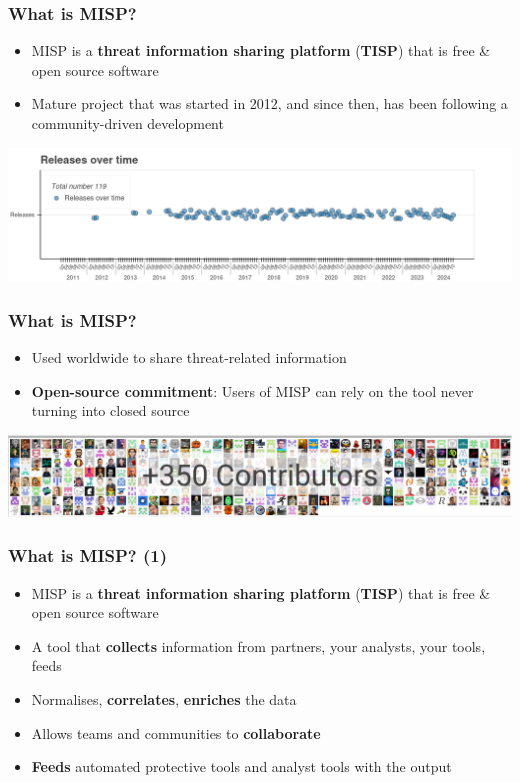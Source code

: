\begin{frame}
    \frametitle{What is MISP?}
    \begin{itemize}
        \item MISP is a {\bf threat information sharing platform} ({\bf TISP}) that is free \& open source software
        \item Mature project that was started in 2012, and since then, has been following a community-driven development
    \end{itemize}

    \begin{center}
        \includegraphics[width=0.99\linewidth]{release_overtime.png}
    \end{center}
\end{frame}

\begin{frame}
    \frametitle{What is MISP?}
    \begin{itemize}
        \item Used worldwide to share threat-related information
        \item \textbf{Open-source commitment}: Users of MISP can rely on the tool never turning into closed source
    \end{itemize}

    \begin{center}
        \includegraphics[width=0.99\linewidth]{contributors.png}
    \end{center}
\end{frame}

\begin{frame}
    \frametitle{What is MISP? (1)}
    \begin{itemize}
        \item MISP is a {\bf threat information sharing platform} ({\bf TISP}) that is free \& open source software
        \item A tool that {\bf collects} information from partners, your analysts, your tools, feeds
        \item Normalises, {\bf correlates}, {\bf enriches} the data
        \item Allows teams and communities to {\bf collaborate}
        \item {\bf Feeds} automated protective tools and analyst tools with the output
    \end{itemize}
\end{frame}

